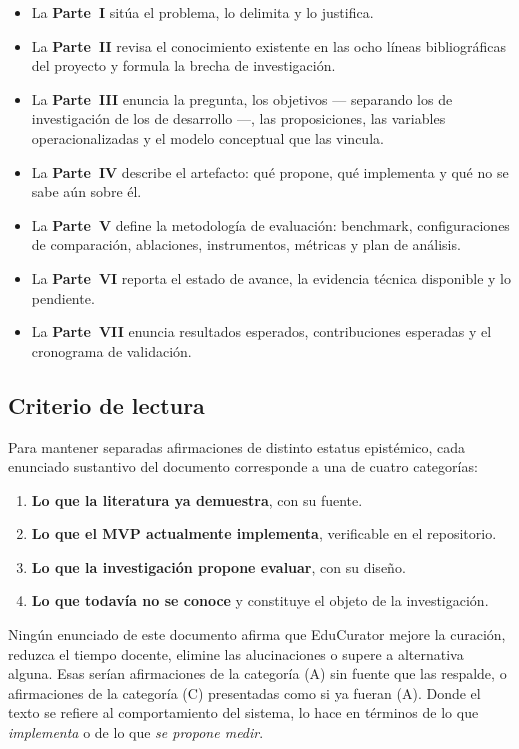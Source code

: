 \begin{itemize}
  \item La \textbf{Parte~I} sitúa el problema, lo delimita y lo justifica.
  \item La \textbf{Parte~II} revisa el conocimiento existente en las ocho líneas
        bibliográficas del proyecto y formula la brecha de investigación.
  \item La \textbf{Parte~III} enuncia la pregunta, los objetivos --- separando los
        de investigación de los de desarrollo ---, las proposiciones, las variables
        operacionalizadas y el modelo conceptual que las vincula.
  \item La \textbf{Parte~IV} describe el artefacto: qué propone, qué implementa y
        qué no se sabe aún sobre él.
  \item La \textbf{Parte~V} define la metodología de evaluación: benchmark,
        configuraciones de comparación, ablaciones, instrumentos, métricas y plan de
        análisis.
  \item La \textbf{Parte~VI} reporta el estado de avance, la evidencia técnica
        disponible y lo pendiente.
  \item La \textbf{Parte~VII} enuncia resultados esperados, contribuciones
        esperadas y el cronograma de validación.
\end{itemize}

\subsection{Criterio de lectura}
\label{sec:criterio-lectura}

Para mantener separadas afirmaciones de distinto estatus epistémico, cada
enunciado sustantivo del documento corresponde a una de cuatro categorías:

\begin{enumerate}[label=\textbf{(\Alph*)}]
  \item \textbf{Lo que la literatura ya demuestra}, con su fuente.
  \item \textbf{Lo que el MVP actualmente implementa}, verificable en el
        repositorio.
  \item \textbf{Lo que la investigación propone evaluar}, con su diseño.
  \item \textbf{Lo que todavía no se conoce} y constituye el objeto de la
        investigación.
\end{enumerate}

\begin{advertencia}
Ningún enunciado de este documento afirma que EduCurator mejore la curación,
reduzca el tiempo docente, elimine las alucinaciones o supere a alternativa alguna.
Esas serían afirmaciones de la categoría (A) sin fuente que las respalde, o
afirmaciones de la categoría (C) presentadas como si ya fueran (A). Donde el texto
se refiere al comportamiento del sistema, lo hace en términos de lo que
\emph{implementa} o de lo que \emph{se propone medir}.
\end{advertencia}
